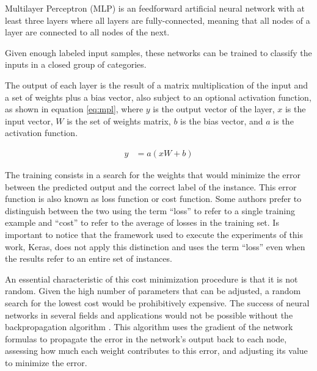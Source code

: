 Multilayer Perceptron (MLP)\cite{rosenblatt_perceptron:_1958} is an feedforward artificial neural network with at least three layers where all layers are fully-connected, meaning that all nodes of a layer are connected to all nodes of the next.

Given enough labeled input samples, these networks can be trained to classify the inputs in a closed group of categories.

The output of each layer is the result of a matrix multiplication of the input and a set of weights plus a bias vector, also subject to an optional activation function, as shown in equation \ref{eq:mpl}, where $y$ is the output vector of the layer, $x$ is the input vector, $W$ is the set of weights matrix, $b$ is the bias vector, and $a$ is the activation function.

\begin{align}
\label{eq:mpl}     
y &= a(x W + b)
\end{align}


The training consists in a search for the weights that would minimize the error between the predicted output and the correct label of the instance. This error function is also known as loss function or cost function. Some authors prefer to distinguish between the two using the term ``loss'' to refer to a single training example and ``cost'' to refer to the average of losses in the training set. Is important to notice that the framework used to execute the experiments of this work, Keras, does not apply this distinction and uses the term ``loss'' even when the results refer to an entire set of instances.

An essential characteristic of this cost minimization procedure is that it is not random. Given the high number of parameters that can be adjusted, a random search for the lowest cost would be prohibitively expensive. The success of neural networks in several fields and applications would not be possible without the backpropagation algorithm \cite{rumelhart_general_1986}. This algorithm uses the gradient of the network formulas to propagate the error in the network's output back to each node, assessing how much each weight contributes to this error, and adjusting its value to minimize the error.